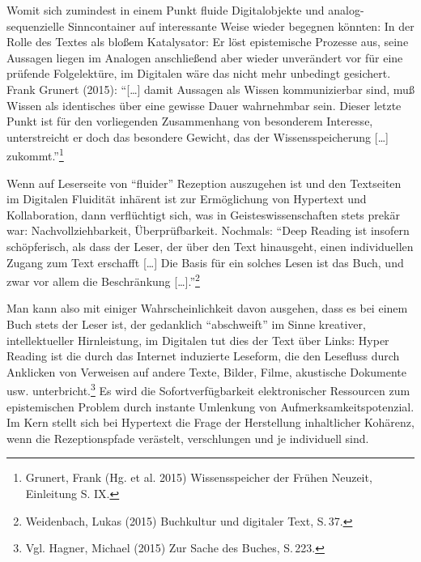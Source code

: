 \documentclass[a4paper,
fontsize=11pt,
oneside,
numbers=noperiodatend,
parskip=half-,
bibliography=totoc,
final
]{scrartcl}
\begin{document}
Womit sich zumindest in einem Punkt fluide Digitalobjekte und
analog-sequenzielle Sinncontainer auf interessante Weise wieder begegnen
könnten: In der Rolle des Textes als bloßem Katalysator: Er löst
epistemische Prozesse aus, seine Aussagen liegen im Analogen
anschließend aber wieder unverändert vor für eine prüfende Folgelektüre,
im Digitalen wäre das nicht mehr unbedingt gesichert. Frank Grunert
(2015): \enquote{{[}\ldots{}{]} damit Aussagen als Wissen kommunizierbar
sind, muß Wissen als identisches über eine gewisse Dauer wahrnehmbar
sein. Dieser letzte Punkt ist für den vorliegenden Zusammenhang von
besonderem Interesse, unterstreicht er doch das besondere Gewicht, das
der Wissensspeicherung {[}\ldots{}{]} zukommt.}\footnote{Grunert, Frank
  (Hg. et al. 2015) Wissensspeicher der Frühen Neuzeit, Einleitung S.
  IX.}

Wenn auf Leserseite von \enquote{fluider} Rezeption auszugehen ist und
den Textseiten im Digitalen Fluidität inhärent ist zur Ermöglichung von
Hypertext und Kollaboration, dann verflüchtigt sich, was in
Geisteswissenschaften stets prekär war: Nachvollziehbarkeit,
Überprüfbarkeit. Nochmals: \enquote{Deep Reading ist insofern
schöpferisch, als dass der Leser, der über den Text hinausgeht, einen
individuellen Zugang zum Text erschafft {[}\ldots{}{]} Die Basis für ein
solches Lesen ist das Buch, und zwar vor allem die Beschränkung
{[}\ldots{}{]}.}\footnote{Weidenbach, Lukas (2015) Buchkultur und
  digitaler Text, S.\,37.}

Man kann also mit einiger Wahrscheinlichkeit davon ausgehen, dass es bei
einem Buch stets der Leser ist, der gedanklich \enquote{abschweift} im
Sinne kreativer, intellektueller Hirnleistung, im Digitalen tut dies der
Text über Links: Hyper Reading ist die durch das Internet induzierte
Leseform, die den Lesefluss durch Anklicken von Verweisen auf andere
Texte, Bilder, Filme, akustische Dokumente usw. unterbricht.\footnote{Vgl.
  Hagner, Michael (2015) Zur Sache des Buches, S.\,223.} Es wird die
Sofortverfügbarkeit elektronischer Ressourcen zum epistemischen Problem
durch instante Umlenkung von Aufmerksamkeitspotenzial. Im Kern stellt
sich bei Hypertext die Frage der Herstellung inhaltlicher Kohärenz, wenn
die Rezeptionspfade verästelt, verschlungen und je individuell sind.
\end{document}
